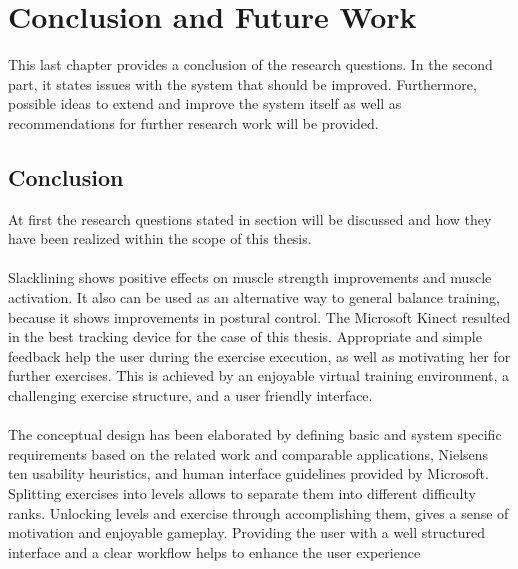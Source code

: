 \chapter{Conclusion and Future Work}\label{7_conclusion}
This last chapter provides a conclusion of the research questions.
In the second part, it states issues with the system that should be improved.
Furthermore, possible ideas to extend and improve the system itself as well as recommendations for further research work will be provided.

\section{Conclusion}
At first the research questions stated in section \textit{} will be discussed and how they have been realized within the scope of this thesis.

\subsubsection{}
Slacklining shows positive effects on muscle strength improvements and muscle activation.
It also can be used as an alternative way to general balance training, because it shows improvements in postural control.
The Microsoft Kinect resulted in the best tracking device for the case of this thesis.
Appropriate and simple feedback help the user during the exercise execution, as well as motivating her for further exercises.
This is achieved by an enjoyable virtual training environment, a challenging exercise structure, and a user friendly interface.


\subsubsection{}
The conceptual design has been elaborated by defining basic and system specific requirements based on the related work and comparable applications, Nielsens ten usability heuristics, and human interface guidelines provided by Microsoft.
Splitting exercises into levels allows to separate them into different difficulty ranks.
Unlocking levels and exercise through accomplishing them, gives a sense of motivation and enjoyable gameplay.
Providing the user with a well structured interface and a clear workflow helps to enhance the user experience

